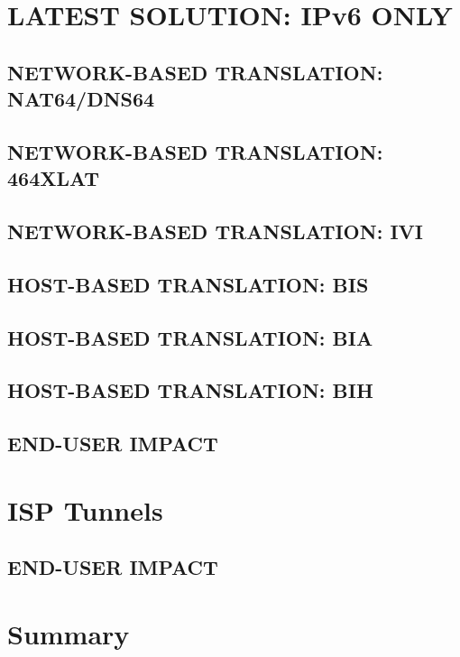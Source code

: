 \documentclass[format=sigconf, natbib=true, nonacm=true]{acmart}
\begin{document}
    \section{LATEST SOLUTION: IPv6 ONLY}
    \lipsum[21]
    \subsection{NETWORK-BASED TRANSLATION: NAT64/DNS64}
    \lipsum[22-24]
    \subsection{NETWORK-BASED TRANSLATION: 464XLAT}
    \lipsum[24-26]
    \subsection{NETWORK-BASED TRANSLATION: IVI}
    \lipsum[26-28]
    \subsection{HOST-BASED TRANSLATION: BIS}
    \lipsum[26-28]
    \subsection{HOST-BASED TRANSLATION: BIA}
    \lipsum[26-28]
    \subsection{HOST-BASED TRANSLATION: BIH}
    \lipsum[26-28]
    \subsection*{END-USER IMPACT}
    \lipsum[18-21]

    \section{ISP Tunnels}
    \lipsum[21-25]
    
    \subsection*{END-USER IMPACT}
    \lipsum[18-22]

    \section{Summary}
    \lipsum[100-104]

    
    
\end{document}
